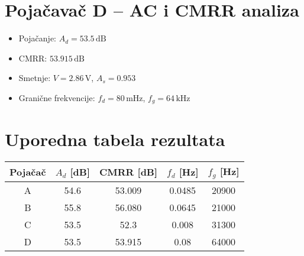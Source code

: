 \documentclass[a4paper]{article}
\begin{document}
\newpage
\section*{Poja\v{c}ava\v{c} D -- AC i CMRR analiza}
\begin{itemize}
  \item Poja\v{c}anje: $A_d = 53.5\,\text{dB}$
  \item CMRR: $53.915\,\text{dB}$
  \item Smetnje: $V = 2.86\,\text{V}$, $A_s = 0.953$
  \item Grani\v{c}ne frekvencije: $f_d = 80\,\text{mHz}$, $f_g = 64\,\text{kHz}$
\end{itemize}

\newpage
\section*{Uporedna tabela rezultata}
\begin{center}
\renewcommand{\arraystretch}{1.3}
\begin{tabular}{|c|c|c|c|c|}
\hline
Poja\v{c}a\v{c} & $A_d$ [dB] & CMRR [dB] & $f_d$ [Hz] & $f_g$ [Hz] \\
\hline
A & 54.6 & 53.009 & 0.0485 & 20900 \\
B & 55.8 & 56.080 & 0.0645 & 21000 \\
C & 53.5 & 52.3   & 0.008  & 31300 \\
D & 53.5 & 53.915 & 0.08   & 64000 \\
\hline
\end{tabular}
\end{center}
\end{document}
